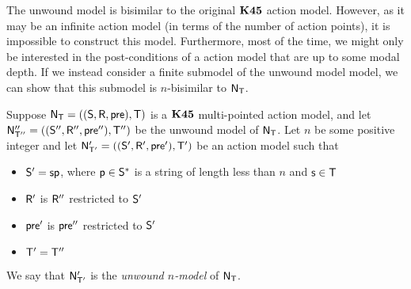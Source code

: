 The unwound model is bisimilar to the original $\AXKFF$ action model.
However, as it may be an infinite action model (in terms of the number of action
points), it is impossible to construct this model.
Furthermore, most of the time, we might only be interested in the
post-conditions of a action model that are up to some modal depth.
If we instead consider a finite submodel of the unwound model
model, we can show that this submodel is $n$-bisimilar to $\evM_\evT$.

\begin{defn} \label{unwoundNModel}
  Suppose $\evM_\evT = ((\evS,\evR,\evpr),\evT)$ is a $\AXKFF$ multi-pointed action model, and
	let $\evM''_{\evT''} = ((\evS'',\evR'',\evpr''),\evT'')$ be the unwound model of $\evM_\evT$.
  Let $n$ be some positive integer and let $\evM'_{\evT'} = ((\evS',\evR',\evpr'),\evT')$ be an action model such that
  \begin{itemize}
		\item $\evS' = \evs \evp$, where $\evp \in \evS^\ast$ is a string of length
    less than $n$ and $\evs \in \evT$
		\item $\evR'$ is $\evR''$ restricted to $\evS'$
		\item $\evpr'$ is $\evpr''$ restricted to $\evS'$
		\item $\evT' = \evT''$
  \end{itemize}
  We say that $\evM'_{\evT'}$ is the {\em unwound $n$-model} of $\evM_\evT$.
\end{defn}

